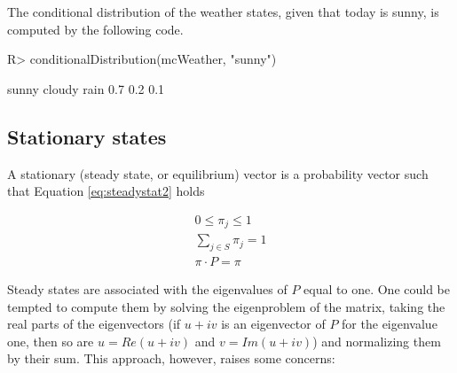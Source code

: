 \documentclass[
  nojss]{jss}
\begin{document}
The conditional distribution of the weather states, given that today is sunny,
is computed by the following code.

\begin{CodeChunk}
\begin{CodeInput}
R> conditionalDistribution(mcWeather, "sunny")
\end{CodeInput}
\begin{CodeOutput}
 sunny cloudy   rain 
   0.7    0.2    0.1 
\end{CodeOutput}
\end{CodeChunk}

\subsection{Stationary states}\label{stationary-states}

A stationary (steady state, or equilibrium) vector is a probability vector such that Equation \ref{eq:steadystat2} holds

\begin{equation}
\begin{matrix}
0\leq \pi_j \leq 1\\ 
\sum_{j \in S} \pi_j = 1\\ 
\pi \cdot P = \pi
\end{matrix}
\label{eq:steadystat2}
\end{equation}

Steady states are associated with the eigenvalues of \(P\) equal to one. One could be tempted to compute them by solving the eigenproblem of the matrix, taking the real parts of the eigenvectors (if \(u + iv\) is an eigenvector of \(P\) for the eigenvalue one, then so are \(u = Re(u + iv)\) and \(v = Im(u + iv)\)) and normalizing them by their sum. This approach, however, raises some concerns:
\end{document}

